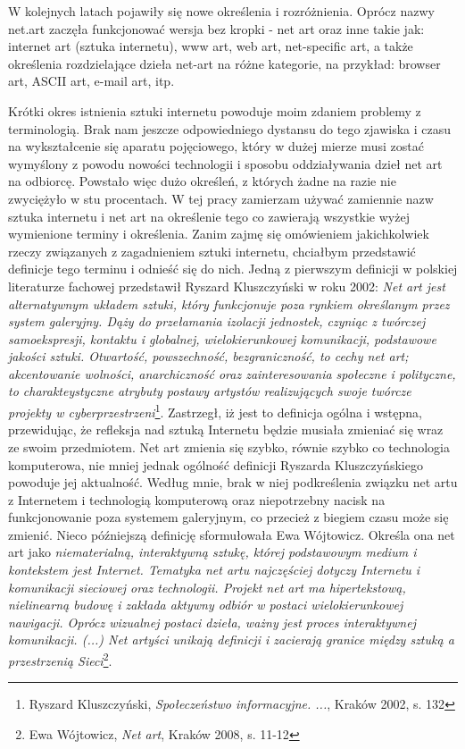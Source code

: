 \documentclass[a4paper,12pt,twoside]{article}
\begin{document}
W kolejnych latach pojawiły się nowe określenia i rozróżnienia.
Oprócz nazwy net.art zaczęła funkcjonować wersja bez kropki - net art
oraz inne takie jak: internet art (sztuka internetu), www art, web art,
net-specific art, a także określenia rozdzielające dzieła net-art
na różne kategorie, na przykład: browser art, ASCII art, e-mail art, itp.

Krótki okres istnienia sztuki internetu powoduje moim zdaniem problemy
z terminologią. Brak nam jeszcze odpowiedniego dystansu do tego zjawiska
i czasu na wykształcenie się aparatu pojęciowego, który w dużej mierze
musi zostać wymyślony z powodu nowości technologii i sposobu oddziaływania
dzieł net art na odbiorcę. Powstało więc dużo określeń, z których żadne
na razie nie zwyciężyło w stu procentach.
W tej pracy zamierzam używać zamiennie nazw sztuka internetu i net art
na określenie tego co zawierają wszystkie wyżej wymienione terminy
i określenia. Zanim zajmę się omówieniem jakichkolwiek rzeczy związanych
z zagadnieniem sztuki internetu, chciałbym przedstawić definicje
tego terminu i odnieść się do nich.
Jedną z pierwszym definicji
w polskiej literaturze fachowej przedstawił Ryszard Kluszczyński w roku 2002:
\textit{Net art jest alternatywnym układem sztuki, który funkcjonuje
poza rynkiem określanym przez system galeryjny. Dąży do przełamania
izolacji jednostek, czyniąc z twórczej samoekspresji, kontaktu i globalnej,
wielokierunkowej komunikacji, podstawowe jakości sztuki. Otwartość,
powszechność, bezgraniczność, to cechy net art; akcentowanie wolności,
anarchiczność oraz zainteresowania społeczne i polityczne, to charakteystyczne
atrybuty postawy artystów realizujących swoje twórcze projekty
w cyberprzestrzeni}\footnote{Ryszard Kluszczyński,
\textit{Społeczeństwo informacyjne. ...}, Kraków 2002, s. 132}.
Zastrzegł, iż jest to definicja ogólna i wstępna, przewidując, że refleksja
nad sztuką Internetu będzie musiała zmieniać się wraz ze swoim przedmiotem.
Net art zmienia się szybko, równie szybko co technologia komputerowa,
nie mniej jednak ogólność definicji Ryszarda Kluszczyńskiego powoduje
jej aktualność. Według mnie, brak w niej podkreślenia związku net artu
z Internetem i technologią komputerową oraz niepotrzebny nacisk na
funkcjonowanie poza systemem galeryjnym, co przecież z biegiem czasu
może się zmienić.
Nieco późniejszą definicję sformułowała Ewa Wójtowicz. Określa ona net art
jako %
\textit{niematerialną, interaktywną sztukę, której podstawowym
medium i kontekstem jest Internet. Tematyka net artu najczęściej dotyczy
Internetu i komunikacji sieciowej oraz technologii. Projekt net art ma
hipertekstową, nielinearną budowę i zakłada aktywny odbiór w postaci
wielokierunkowej nawigacji. Oprócz wizualnej postaci dzieła, ważny jest
proces interaktywnej komunikacji. (...) Net artyści unikają definicji
i zacierają granice między sztuką a przestrzenią
Sieci}\footnote{Ewa Wójtowicz, \textit{Net art}, Kraków 2008, s. 11-12}.
\end{document}
